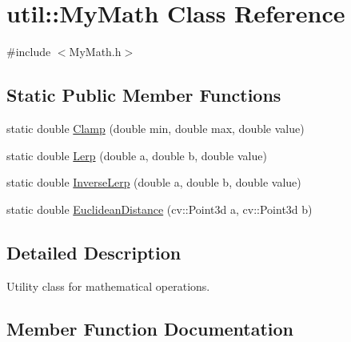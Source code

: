 \hypertarget{classutil_1_1MyMath}{}\section{util\+:\+:My\+Math Class Reference}
\label{classutil_1_1MyMath}


{\ttfamily \#include $<$My\+Math.\+h$>$}

\subsection*{Static Public Member Functions}
\begin{DoxyCompactItemize}
\item 
static double \hyperlink{classutil_1_1MyMath_a367a261dc52a85cc97ba376799ed13a3}{Clamp} (double min, double max, double value)
\item 
static double \hyperlink{classutil_1_1MyMath_ae68f361889a9929767b0c85ad7a010f1}{Lerp} (double a, double b, double value)
\item 
static double \hyperlink{classutil_1_1MyMath_a789c283b324494ab50955af1e35178d5}{Inverse\+Lerp} (double a, double b, double value)
\item 
static double \hyperlink{classutil_1_1MyMath_abaf214b2fc7a31e43cf07245cf4b2e1f}{Euclidean\+Distance} (cv\+::\+Point3d a, cv\+::\+Point3d b)
\end{DoxyCompactItemize}


\subsection{Detailed Description}
Utility class for mathematical operations. 

\subsection{Member Function Documentation}
